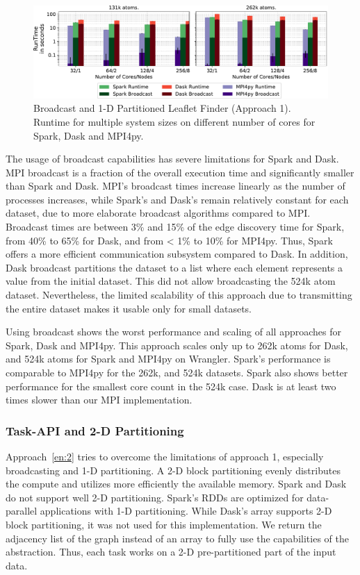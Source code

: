 \begin{figure}[t]
    \centering
    \includegraphics[width=.75\textwidth]{figures/data_analytics_hpc/task_par/spark_dask_lf_approach1.pdf}
    \caption{Broadcast and 1-D Partitioned Leaflet Finder (Approach 1). Runtime
    for multiple system sizes on different number of cores for Spark, Dask and
    MPI4py.}
    \label{fig:WranglerLeafLetFinderApp1}
\end{figure}

The usage of broadcast capabilities has severe limitations for Spark and Dask.
MPI broadcast is a fraction of the overall execution time and significantly
smaller than Spark and Dask. MPI's broadcast times increase linearly as the
number of processes increases, while Spark's and Dask's remain relatively
constant for each dataset, due to more elaborate broadcast algorithms compared
to MPI. Broadcast times are between 3\% and 15\% of the edge discovery time
for Spark, from 40\% to 65\% for Dask, and from < 1\% to 10\% for MPI4py.
Thus, Spark offers a more efficient communication subsystem compared to Dask. In
addition, Dask broadcast partitions the dataset to a list where each element
represents a value from the initial dataset. This did not allow broadcasting the
524k atom dataset. Nevertheless, the limited scalability of this approach due
to transmitting the entire dataset makes it usable only for small datasets.

Using broadcast shows the worst performance and scaling of all approaches for
Spark, Dask and MPI4py. This approach scales only up to 262k atoms for Dask,
and 524k atoms for Spark and MPI4py on Wrangler. Spark's performance is
comparable to MPI4py for the 262k, and 524k datasets. Spark
also shows better performance
for the smallest core count in the 524k case. Dask is at least two times
slower than our MPI implementation.

\subsubsection*{Task-API and 2-D Partitioning}

Approach~\ref{en:2} tries to overcome the limitations of approach 1, especially
broadcasting and 1-D partitioning. A 2-D block partitioning evenly distributes
the compute and utilizes  more efficiently the available memory.
Spark and Dask do not support well 2-D partitioning. Spark's RDDs
are optimized for data-parallel applications with 1-D partitioning. While Dask's
array supports 2-D block partitioning, it was not used for this implementation.
We return the adjacency list of the graph instead of an array to fully use the
capabilities of the abstraction. Thus, each task works on a 2-D pre-partitioned
part of the input data.


